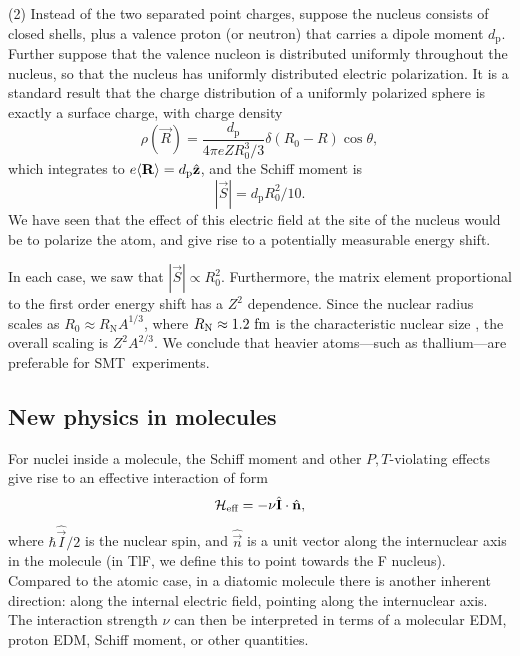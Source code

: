(2) Instead of the two separated point charges, suppose the nucleus consists of
closed shells, plus a valence proton (or neutron) that carries a dipole moment
$d_\text{p}$. Further suppose that the valence nucleon is distributed uniformly
throughout the nucleus, so that the nucleus has uniformly distributed electric
polarization. It is a standard result that the charge distribution of a
uniformly polarized sphere is exactly a surface charge, with charge density
%
\[
\rho(\vec R)=\frac{d_\text{p}}{4\pi eZR_0^3/3}\delta(R_0-R)\cos\theta,
\]
which integrates to $e\langle \mathbf{R}\rangle=d_\text{p}\hat{\mathbf{z}}$, and the Schiff moment is
%
\begin{equation}
    \label{protonSMT}
    |\vec S|=d_\text{p}R_0^2/10.
\end{equation}
%
We have seen that the effect of this electric field at the site of the nucleus
would be to polarize the atom, and give rise to a potentially measurable energy
shift.

In each case, we saw that $|\vec S|\propto R_0^2$. Furthermore, the matrix
element proportional to the first order energy shift has a $Z^2$ dependence.
Since the nuclear radius scales as $R_0\approx R_\text{N}A^{1/3}$, where
$R_\text{N}\approx1.2~\mathrm{fm}$ is the characteristic nuclear size
\cite[eqn~3.8]{krane1987introductory}, the overall scaling is $Z^2 A^{2/3}$. We
conclude that heavier atoms---such as thallium---are preferable for \gls{SMT}\
experiments.

\subsection{New physics in molecules}

For nuclei inside a molecule, the Schiff moment and other $P,T$-violating
effects give rise to an effective interaction of form
%
\begin{equation}
   \label{interaction}
    \mathcal{H}_{\text{eff}}=-\nu\hat{\mathbf{I}}\cdot\hat{\mathbf{n}},
\end{equation}
%
where $\hbar\hat{\vec I}/2$ is the nuclear spin, and $\hat{\vec n}$ is a unit
vector along the internuclear axis in the molecule (in TlF, we define this to
point towards the F nucleus). Compared to the atomic case, in a diatomic
molecule there is another inherent direction: along the internal electric field,
pointing along the internuclear axis. The interaction strength $\nu$ can then be
interpreted in terms of a molecular \gls{EDM}, proton \gls{EDM}, Schiff moment,
or other quantities.

